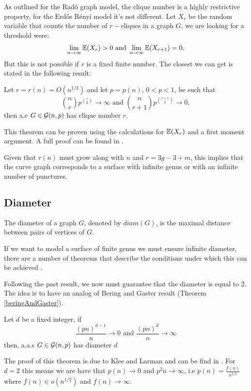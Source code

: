 As outlined for the Radó graph model, the clique number is a highly restrictive property, for the Erdős Rényi model it's not different. Let $X_r$ be the random variable that counts the number of $r-$cliques in a graph $G$, we are looking for a threshold were:
$$\lim\limits_{n \to \infty}\mathbb{E}(X_{r}) > 0 \text{ and } \lim\limits_{n \to \infty}\mathbb{E} (X_{r+1}) = 0.$$
But this is not possible if $r$ is a fixed finite number. The closest we can get is stated in the following result:
\begin{theorem}\label{cliqueNumberER}
Let $r = r(n) = O(n^{1/3})$ and let $p=p(n)$, $0<p<1$, be such that
$$\binom{n}{r} p^{\binom{r}{2}} \to \infty \text{ and } \binom{n}{r+1} p^{\binom{r+1}{2}} \to 0,$$
then a.e $G\in\mathcal{G}(n,p)$ has clique number $r$.
\end{theorem}

 This theorem can be proven using the calculations for $\mathbb{E}(X_{r})$ and a first moment argument. A full proof can be found in \cite[Bollobás, p.~290]{Bollobas}.

Given that $r(n)$ must grow along with $n$ and $r=3g-3+m$, this implies that the curve graph corresponds to a surface with infinite genus or with an infinite number of punctures.

\subsection{Diameter}

The diameter of a graph $G$, denoted by $diam(G)$, is the maximal distance between pairs of vertices of $G$.

If we want to model a surface of finite genus we must ensure infinite diameter, there are a number of theorems that describe the conditions under which this can be achieved \cite[Bollobás, p.~259]{Bollobas}.

Following the past result, we now must guarantee that the diameter is equal to 2. The idea is to have an analog of Bering and Gaster result (Theorem \ref{beringAndGaster}).

\begin{theorem}\label{diameterER}
Let $d$ be a fixed integer, if 
$$\frac{(pn)^{d-1}}{n} \to 0 \text{ and } \frac{(pn)^{d}}{n} \to \infty $$
then, a.a.s $G\in\mathcal{G}(n,p)$ has diameter $d$
\end{theorem}

The proof of this theorem is due to Klee and Larman and can be find in \cite[Klee, Larman 81]{diameters}. For $d=2$ this means we are have that $p(n)\to 0$ and $p^2 \dot n\to \infty$, i.e $p(n)= \frac{f(n)}{n^{1/2}}$ where $f(n)\in o(n^{1/2})$ and $f(n)\to \infty$.

